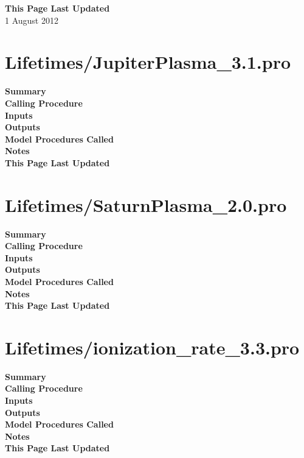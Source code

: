 \documentclass[11pt]{article}
\newcommand\descrip[1]{\textsf{\textbf{\large{#1}}}\\}
\begin{document}
\descrip{This Page Last Updated}
1 August 2012

\clearpage

\section{Lifetimes/JupiterPlasma\_3.1.pro} \label{sec:JupiterPlasma}

\descrip{Summary}

\descrip{Calling Procedure}

\descrip{Inputs}

\descrip{Outputs}

\descrip{Model Procedures Called}

\descrip{Notes}

\descrip{This Page Last Updated}

\clearpage

\section{Lifetimes/SaturnPlasma\_2.0.pro} \label{sec:SaturnPlasma}

\descrip{Summary}

\descrip{Calling Procedure}

\descrip{Inputs}

\descrip{Outputs}

\descrip{Model Procedures Called}

\descrip{Notes}

\descrip{This Page Last Updated}

\clearpage

\section{Lifetimes/ionization\_rate\_3.3.pro} \label{sec:ionization_rate}

\descrip{Summary}

\descrip{Calling Procedure}

\descrip{Inputs}

\descrip{Outputs}

\descrip{Model Procedures Called}

\descrip{Notes}

\descrip{This Page Last Updated}
\end{document}
